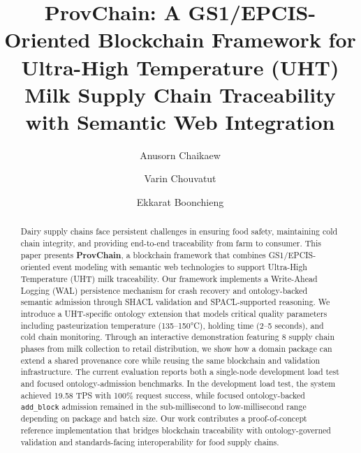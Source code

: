 \documentclass[preprint,review,12pt,authoryear]{elsarticle}
\def\orcidlink#1{}%
\def\corref#1{}%
\begin{document}
\hypersetup{pageanchor=false}
\begin{frontmatter}

\title{ProvChain: A GS1/EPCIS-Oriented Blockchain Framework for Ultra-High Temperature (UHT) Milk Supply Chain Traceability with Semantic Web Integration}

\author[1]{Anusorn Chaikaew\orcidlink{0000-0002-4715-677X}}

\author[1]{Varin Chouvatut\orcidlink{0009-0008-9125-4650}}

\author[1]{Ekkarat Boonchieng\orcidlink{0000-0002-7584-1627}\corref{cor1}}


\address[1]{Department of Computer Science, Faculty of Science, Chiang Mai University, Chiang Mai 50200, Thailand}

\begin{abstract}
Dairy supply chains face persistent challenges in ensuring food safety, maintaining cold chain integrity, and providing end-to-end traceability from farm to consumer. This paper presents \textbf{ProvChain}, a blockchain framework that combines GS1/EPCIS-oriented event modeling with semantic web technologies to support Ultra-High Temperature (UHT) milk traceability. Our framework implements a Write-Ahead Logging (WAL) persistence mechanism for crash recovery and ontology-backed semantic admission through SHACL validation and SPACL-supported reasoning. We introduce a UHT-specific ontology extension that models critical quality parameters including pasteurization temperature (135--150°C), holding time (2--5 seconds), and cold chain monitoring. Through an interactive demonstration featuring 8 supply chain phases from milk collection to retail distribution, we show how a domain package can extend a shared provenance core while reusing the same blockchain and validation infrastructure. The current evaluation reports both a single-node development load test and focused ontology-admission benchmarks. In the development load test, the system achieved 19.58 TPS with 100\% request success, while focused ontology-backed \texttt{add\_block} admission remained in the sub-millisecond to low-millisecond range depending on package and batch size. Our work contributes a proof-of-concept reference implementation that bridges blockchain traceability with ontology-governed validation and standards-facing interoperability for food supply chains.
\end{abstract}


\end{frontmatter}
\end{document}
